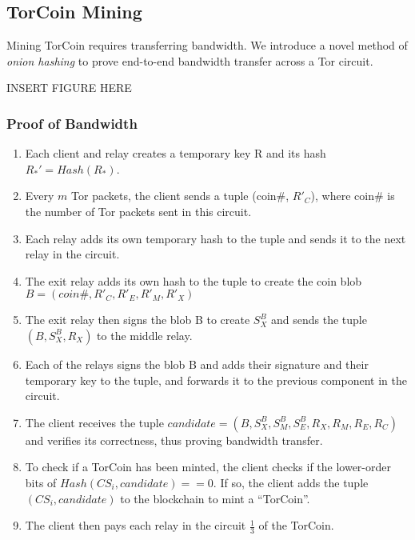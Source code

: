 \subsection{TorCoin Mining}

Mining TorCoin requires transferring bandwidth. We introduce a novel method of
\textit{onion hashing} to prove end-to-end bandwidth transfer across a Tor
circuit.

INSERT FIGURE HERE

\subsubsection{Proof of Bandwidth}
\begin{enumerate}
\item Each client and relay creates a temporary key R and its hash $R_*' = Hash(R_*)$. 
\item Every $m$ Tor packets, the client sends a tuple (coin\#, $R'_C$), where coin\# is the number of Tor packets sent in this circuit.
\item Each relay adds its own temporary hash to the tuple and sends it to the next relay in the circuit.
\item The exit relay adds its own hash to the tuple to create the coin blob 
$B = (coin\#, R'_{C}, R'_{E}, R'_{M}, R'_{X})$ 
\item The exit relay then signs the blob B to create $S^B_X$ and sends the tuple $(B, S^B_X, R_X)$ to the middle relay.
\item Each of the relays signs the blob B and adds their signature and their temporary key to the tuple, and forwards it to the previous component in the circuit. 
\item The client receives the tuple $candidate = (B, S^B_X, S^B_M, S^B_E, R_X, R_M, R_E, R_C)$ and verifies its correctness, thus proving bandwidth transfer.
\item To check if a TorCoin has been minted, the client checks if the lower-order bits of $Hash(CS_i, candidate) == 0$. If so, the client adds the tuple $(CS_i, candidate)$ to the blockchain to mint a ``TorCoin''.
\item The client then pays each relay in the circuit $\frac{1}{3}$ of the TorCoin. 
\end{enumerate}

